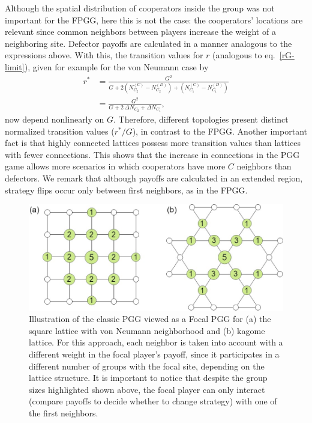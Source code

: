 \documentclass[5p,review]{elsarticle}
\begin{document}
%
Although the spatial distribution of cooperators inside the group was not important for the FPGG, here this is not the case:  the cooperators' locations are relevant since common neighbors between players increase the weight of a neighboring site. Defector payoffs are calculated in a manner analogous to the expressions above. 
%
With this, the transition values for $r$ (analogous to eq.~\ref{rG-limit}),
 given for example for the von Neumann case by
\begin{equation}
\begin{split}
    r^{*} &=\frac{G^2}{G+2\left(N_{C_2}^{\scriptscriptstyle(C)}-N_{C_2}^{\scriptscriptstyle(D)}\right)+\left(N_{C_{1}}^{\scriptscriptstyle(C)}-N_{C_1}^{\scriptscriptstyle(D)}\right)} \\
    &= \frac{G^2}{G+2\,\Delta N_{C_2}+\Delta N_{C_1}},
    \end{split}
      \label{eq.trans_PGG}
\end{equation}
%
now depend nonlinearly on $G$.
%
Therefore, different topologies present distinct normalized transition values ($r^{*}/G$), in contrast to the FPGG. 
%
Another important fact is that highly connected lattices possess more transition values than lattices with fewer connections. This shows that the increase in connections in the PGG game allows more scenarios in which cooperators have more $C$ neighbors than defectors. We remark that although payoffs are calculated in an extended region, strategy flips occur only between first neighbors, as in the FPGG.
%


 \begin{figure}[t]
    \centering
    \includegraphics[width=\linewidth]{figs/pgg_qk.jpg}
    \caption{Illustration of the classic PGG viewed as a Focal PGG for (a) the square lattice with von Neumann neighborhood and (b) kagome lattice. For this approach, each neighbor is taken into account with a different weight in the focal player's payoff, since it participates in a different number of groups with the focal site, depending on the lattice structure. It is important to notice that despite the group sizes highlighted shown above, the focal player can only interact (compare payoffs to decide whether to change strategy) with one of the first neighbors.
    }
    \label{pgg2}
\end{figure}
\end{document}
